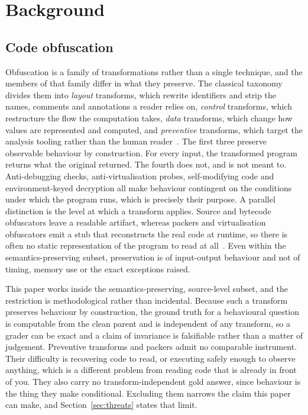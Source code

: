 \section{Background}
\label{sec:background}

\subsection{Code obfuscation}
Obfuscation is a family of transformations rather than a single technique, and the members of that
family differ in what they preserve. The classical taxonomy divides them into \emph{layout}
transforms, which rewrite identifiers and strip the names, comments and annotations a reader relies
on, \emph{control} transforms, which restructure the flow the computation takes, \emph{data}
transforms, which change how values are represented and computed, and \emph{preventive} transforms,
which target the analysis tooling rather than the human
reader~\cite{collberg1997taxonomy,collberg2002manufacturing}. The first three preserve observable
behaviour by construction. For every input, the transformed program returns what the original
returned. The fourth does not, and is not meant to. Anti-debugging checks, anti-virtualisation
probes, self-modifying code and environment-keyed decryption all make behaviour contingent on the
conditions under which the program runs, which is precisely their purpose. A parallel distinction is
the level at which a transform applies. Source and bytecode obfuscators leave a readable artifact,
whereas packers and virtualisation obfuscators emit a stub that reconstructs the real code at
runtime, so there is often no static representation of the program to read at
all~\cite{roundy2013packers,schrittwieser2016protecting}. Even within the semantics-preserving
subset, preservation is of input-output behaviour and not of timing, memory use or the exact
exceptions raised.

This paper works inside the semantics-preserving, source-level subset, and the restriction is
methodological rather than incidental. Because such a transform preserves behaviour by construction,
the ground truth for a behavioural question is computable from the clean parent and is independent
of any transform, so a grader can be exact and a claim of invariance is falsifiable rather than a
matter of judgement. Preventive transforms and packers admit no comparable instrument. Their
difficulty is recovering code to read, or executing safely enough to observe anything, which is a
different problem from reading code that is already in front of you. They also carry no
transform-independent gold answer, since behaviour is the thing they make conditional. Excluding
them narrows the claim this paper can make, and Section~\ref{sec:threats} states that limit.

